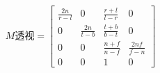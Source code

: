 $$
M透视 =
\begin{bmatrix}
  \frac{2n}{r-l} & 0 & \frac{r+l}{l-r} & 0 \\
  0 & \frac{2n}{t-b} & \frac{t+b}{b-t} & 0 \\
  0 & 0 & \frac{n + f}{n-f} & \frac{2nf}{f-n} \\
  0 & 0 & 1 & 0
\end{bmatrix}
$$